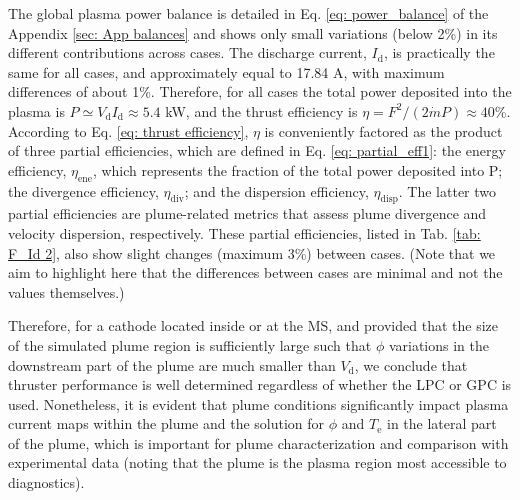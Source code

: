 \documentclass[%
 aip,
cha,
 amsmath,amssymb,
 reprint,%
]{revtex4-1}
\begin{document}
The global plasma power balance is detailed in Eq. \eqref{eq: power_balance} of the Appendix \ref{sec: App balances} and shows only small variations (below 2\%) in its different contributions across cases. 
%
The discharge current, $I_\mathrm{d}$, is practically the same for all cases, and approximately equal to 17.84 A, with maximum differences of about 1\%. Therefore, for all cases the total power deposited into the plasma is $P \simeq V_\mathrm{d}I_\mathrm{d} \approx 5.4$ kW, and the thrust efficiency is $\eta = F^2/(2\dot{m}P) \approx 40\%$.
%
According to Eq. \eqref{eq: thrust efficiency}, $\eta$ is conveniently factored as the product of three partial efficiencies, which are defined in Eq. \eqref{eq: partial_eff1}: the energy efficiency, $\eta_\mathrm{ene}$, which represents the fraction of the total power deposited into P; the divergence efficiency, $\eta_\mathrm{div}$; and the dispersion efficiency, $\eta_\mathrm{disp}$. The latter two partial efficiencies are plume-related metrics that assess plume divergence and velocity dispersion, respectively.
These partial efficiencies, listed in Tab. \ref{tab: F_Id 2}, also show slight changes (maximum 3\%) between cases. (Note that  we aim to highlight here that the differences between cases are minimal and not the values themselves.)


Therefore, for a cathode located inside or at the MS, and provided that the size of the simulated plume region is sufficiently large such that $\phi$ variations in the downstream part of the plume are much smaller than $V_\mathrm{d}$, we conclude that thruster performance is well determined regardless of whether the LPC or GPC is used. Nonetheless, it is evident that plume conditions significantly impact plasma current maps within the plume and the solution for $\phi$ and $T_\mathrm{e}$ in the lateral part of the plume, which is important for plume characterization and comparison with experimental data (noting that the plume is the plasma region most accessible to diagnostics).
\end{document}
